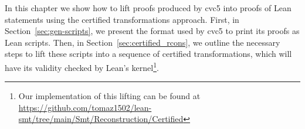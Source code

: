 In this chapter we show how to lift proofs produced by cvc5 into
proofs of Lean statements using the certified transformations approach.
First, in Section~\ref{sec:gen-scripts}, we present the format used by
cvc5 to print its proofs as Lean scripts.
Then, in Section~\ref{sec:certified_rcons}, we outline the necessary
steps to lift these scripts into a sequence of certified transformations,
which will have its validity checked by Lean's kernel\footnote{Our implementation of this lifting can be found at \url{https://github.com/tomaz1502/lean-smt/tree/main/Smt/Reconstruction/Certified}}.
